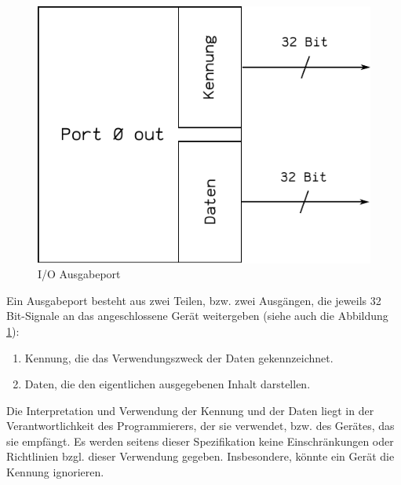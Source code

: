 \begin{figure}[htp]
 \centering
 \includegraphics{./img/UMach-IOPort.pdf}
 \caption{I/O Ausgabeport}
 \label{fig:IOPort}
\end{figure}

Ein Ausgabeport besteht aus zwei Teilen, bzw. zwei Ausgängen, die jeweils 32
Bit-Signale an das angeschlossene Gerät weitergeben (siehe auch die Abbildung
\ref{fig:IOPort}):

\begin{enumerate}
 \item Kennung, die das Verwendungszweck der Daten gekennzeichnet.
 \item Daten, die den eigentlichen ausgegebenen Inhalt darstellen.
\end{enumerate}

Die Interpretation und Verwendung der Kennung und der Daten liegt in der
Verantwortlichkeit des Programmierers, der sie verwendet, bzw. des Gerätes, das
sie empfängt. Es werden seitens dieser Spezifikation keine Einschränkungen oder
Richtlinien bzgl. dieser Verwendung gegeben. Insbesondere, könnte ein Gerät die
Kennung ignorieren.

